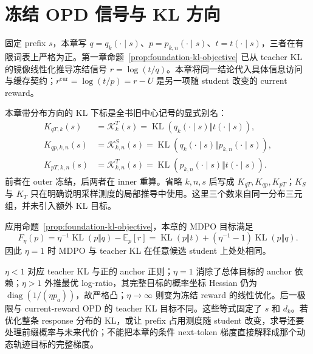 \documentclass[lang=cn,scheme=chinese,openany]{../book/elegantbook}
\newcommand{\E}{\mathbb E}
\newcommand{\KL}{\operatorname{KL}}
\begin{document}
\section{冻结 OPD 信号与 KL 方向}
\label{opd:mirror-origin}

固定 prefix $s$，本章写 $q=q_k(\cdot\mid s)$、$p=p_{k,n}(\cdot\mid s)$、$t=t(\cdot\mid s)$，三者在有限词表上严格为正。第一章命题~\ref{prop:foundation-kl-objective} 已从 teacher KL 的镜像线性化推导冻结信号 $r=\log(t/q)$。本章将同一结论代入具体信息访问与缓存契约；$r^{\mathrm{cur}}=\log(t/p)=r-U$ 是另一项随 student 改变的 current reward。

本章带分布方向的 KL 下标是全书旧中心记号的显式别名：
\begin{align}
K_{qT,k}(s)&=\mathcal K_k^T(s)=\KL(q_k(\cdot\mid s)\Vert t(\cdot\mid s)),\\
K_{qp,k,n}(s)&=\mathcal K_{k,n}^S(s)=\KL(q_k(\cdot\mid s)\Vert p_{k,n}(\cdot\mid s)),\\
K_{pT,k,n}(s)&=\mathcal K_{k,n}^T(s)=\KL(p_{k,n}(\cdot\mid s)\Vert t(\cdot\mid s)).
\end{align}
前者在 outer 冻结，后两者在 inner 重算。省略 $k,n,s$ 后写成 $K_{qT},K_{qp},K_{pT}$；$K_S$ 与 $K_T$ 只在明确说明采样测度的局部推导中使用。这里三个数来自同一分布三元组，并未引入额外 KL 目标。

\begin{corollary}
\label{opd:objective-family}
应用命题~\ref{prop:foundation-kl-objective}，本章的 MDPO 目标满足
\begin{equation}
F_\eta(p)=\eta^{-1}\KL(p\Vert q)-\E_p[r]
=\KL(p\Vert t)+(\eta^{-1}-1)\KL(p\Vert q).
\end{equation}
因此 $\eta=1$ 时 MDPO 与 teacher KL 在任意候选 student 上处处相同。
\end{corollary}

$\eta<1$ 对应 teacher KL 与正的 anchor 正则；$\eta=1$ 消除了总体目标的 anchor 依赖；$\eta>1$ 外推最优 log-ratio，其完整目标的概率坐标 Hessian 仍为 $\operatorname{diag}(1/(\eta p_a))$，故严格凸；$\eta\to\infty$ 则变为冻结 reward 的线性优化。后一极限与 current-reward OPD 的 teacher KL 目标不同。这些等式固定了 $s$ 和 $d_k$。若优化整条 response 分布的 KL，或让 prefix 占用测度随 student 改变，求导还要处理前缀概率与未来代价；不能把本章的条件 next-token 梯度直接解释成那个动态轨迹目标的完整梯度。
\end{document}
